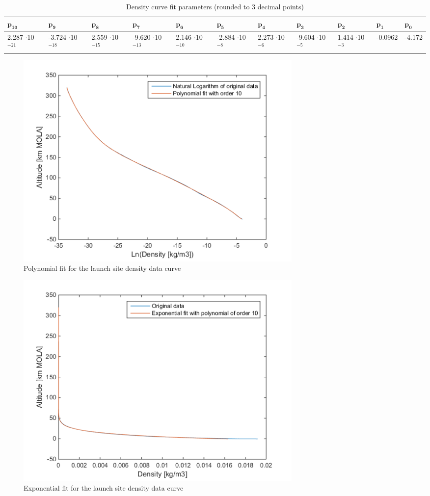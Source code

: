 \begin{table}[H]
\begin{center}
\caption{Density curve fit parameters (rounded to 3 decimal points)}
\label{tab:fitParametersDen}
\begin{tabular}{|p{1.1cm}|p{1.1cm}|p{1.1cm}|p{1.1cm}|p{1.1cm}|p{1.1cm}|p{1.1cm}|p{1.1cm}|p{1.1cm}|p{1.1cm}|p{1.1cm}|}
\hline 
 $\mathbf{p_{10}}$ & $\mathbf{p_{9}}$ & $\mathbf{p_{8}}$ & $\mathbf{p_{7}}$ & $\mathbf{p_{6}}$ & $\mathbf{p_{5}}$ & $\mathbf{p_{4}}$ & $\mathbf{p_{3}}$ & $\mathbf{p_{2}}$ & $\mathbf{p_{1}}$ & $\mathbf{p_{0}}$ \\ \hline 
2.287 $\cdot$10$^{-21}$  & -3.724 $\cdot$10$^{-18}$ & 2.559 $\cdot$10$^{-15}$ & -9.620 $\cdot$10$^{-13}$ & 2.146 $\cdot$10$^{-10}$ & -2.884 $\cdot$10$^{-8}$ & 2.273 $\cdot$10$^{-6}$ & -9.604 $\cdot$10$^{-5}$ & 1.414 $\cdot$10$^{-3}$ & -0.0962 & -4.172\\ \hline
\end{tabular}
\end{center}
\end{table}



\begin{figure}[H]
\centering
\includegraphics[width=0.7\textwidth]{figures/software/completeExpPolyFitDen.png}
\caption{Polynomial fit for the launch site density data curve}
\label{fig:completeExpPolyFitDen}
\end{figure}

\begin{figure}[H]
\centering
\includegraphics[width=0.7\textwidth]{figures/software/completeExpFitDen.png}
\caption{Exponential fit for the launch site density data curve}
\label{fig:completeExpFitDen}
\end{figure}


